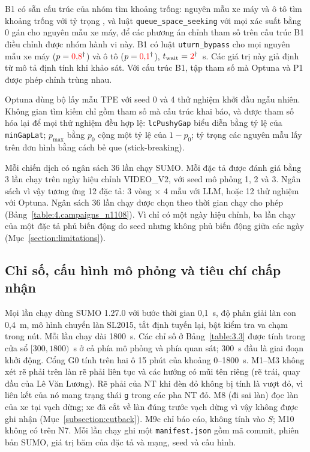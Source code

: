 \documentclass[../main.tex]{subfiles}
\begin{document}
B1 có sẵn cấu trúc của nhóm tìm khoảng trống: nguyên mẫu xe máy và ô tô tìm khoảng trống với tỷ trọng , và luật \texttt{queue\_space\_seeking} với mọi xác suất bằng 0 gán cho nguyên mẫu xe máy, để các phương án chỉnh tham số trên cấu trúc B1 điều chỉnh được nhóm hành vi này. B1 có luật \texttt{uturn\_bypass} cho mọi nguyên mẫu xe máy ($p = \textcolor{red}{0{,}8}^{\dagger}$) và ô tô ($p = \textcolor{red}{0{,}1}^{\dagger}$), $t_{\text{wait}} = \textcolor{red}{2}^{\dagger}$~s. Các giá trị này giả định từ mô tả định tính khi khảo sát. Với cấu trúc B1, tập tham số mà Optuna và P1 được phép chỉnh trùng nhau.

Optuna dùng bộ lấy mẫu TPE với seed 0 và 4 thử nghiệm khởi đầu ngẫu nhiên. Không gian tìm kiếm chỉ gồm tham số mà cấu trúc khai báo, và được tham số hóa lại để mọi thử nghiệm đều hợp lệ: \texttt{lcPushyGap} biểu diễn bằng tỷ lệ của \texttt{minGapLat}; $p_{\max}$ bằng $p_0$ cộng một tỷ lệ của $1-p_0$; tỷ trọng các nguyên mẫu lấy trên đơn hình bằng cách bẻ que (stick-breaking).

Mỗi chiến dịch có ngân sách 36 lần chạy SUMO. Mỗi đặc tả được đánh giá bằng 3 lần chạy trên ngày hiệu chỉnh VIDEO\_V2, với seed mô phỏng 1, 2 và 3. Ngân sách vì vậy tương ứng 12 đặc tả: 3 vòng $\times$ 4 mẫu với LLM, hoặc 12 thử nghiệm với Optuna. Ngân sách 36 lần chạy được chọn theo thời gian chạy cho phép (Bảng~\ref{table:4.campaigns_n1108}). Vì chỉ có một ngày hiệu chỉnh, ba lần chạy của một đặc tả phủ biến động do seed nhưng không phủ biến động giữa các ngày (Mục~\ref{section:limitations}).

\subsection{Chỉ số, cấu hình mô phỏng và tiêu chí chấp nhận}

Mọi lần chạy dùng SUMO 1.27.0 với bước thời gian 0,1~s, độ phân giải làn con 0,4~m, mô hình chuyển làn SL2015, tắt định tuyến lại, bật kiểm tra va chạm trong nút. Mỗi lần chạy dài 1800~s. Các chỉ số ở Bảng~\ref{table:3.3} được tính trong cửa sổ $[300, 1800)$~s ở cả phía mô phỏng và phía quan sát; 300~s đầu là giai đoạn khởi động. Cổng G0 tính trên hai ô 15 phút của khoảng 0--1800~s. M1--M3 không xét rẽ phải trên làn rẽ phải liên tục và các hướng có mũi tên riêng (rẽ trái, quay đầu của Lê Văn Lương). Rẽ phải của NT khi đèn đỏ không bị tính là vượt đỏ, vì liên kết của nó mang trạng thái \texttt{g} trong các pha NT đỏ. M8 (đi sai làn) đọc làn của xe tại vạch dừng; xe đã cắt về làn đúng trước vạch dừng vì vậy không được ghi nhận (Mục~\ref{subsection:cutback}). M9c chỉ báo cáo, không tính vào $S$; M10 không có trên N7. Mỗi lần chạy ghi một \texttt{manifest.json} gồm mã commit, phiên bản SUMO, giá trị băm của đặc tả và mạng, seed và cấu hình.
\end{document}
